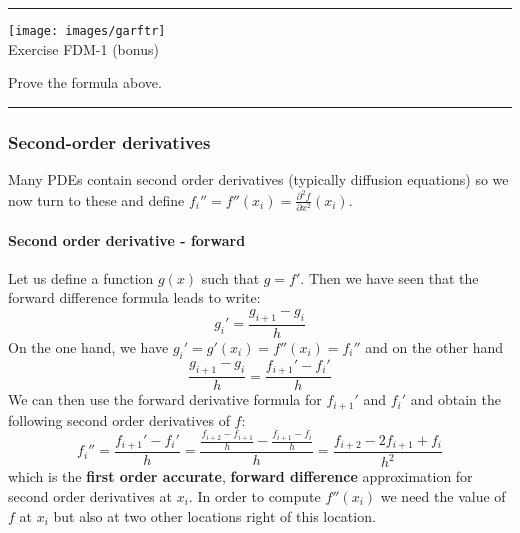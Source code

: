 \begin{center}
\begin{minipage}[t]{0.77\textwidth}
\par\noindent\rule{\textwidth}{0.4pt}

\begin{center}
\texttt{[image: images/garftr]} \\
{\color{orange}Exercise FDM-1 (bonus)}
\end{center}

Prove the formula above.

\par\noindent\rule{\textwidth}{0.4pt}
\end{minipage}
\end{center}





\subsubsection{Second-order derivatives}

Many PDEs contain second order derivatives (typically diffusion equations)
so we now turn to these and 
define $f_i''=f''(x_i) = \frac{\partial^2 f}{\partial x^2} (x_i)$. 

\paragraph{Second order derivative - forward} 
Let us define a function $g(x)$ such that $g=f'$. Then we have seen that the forward 
difference formula leads to write: 
\begin{equation}
g_i' = \frac{g_{i+1}-g_{i}}{h}
\end{equation}
On the one hand, we have $g_i'=g'(x_i)=f''(x_i)=f_i''$ and on the other hand
\begin{equation}
\frac{g_{i+1}-g_{i}}{h} = \frac{f_{i+1}'-f_{i}'}{h}
\end{equation}
We can then use the forward derivative formula for $f_{i+1}'$ and $f_{i}'$ and 
obtain the following second order derivatives of $f$:
\begin{equation}
f_{i}'' 
= \frac{f_{i+1}'-f_i'}{h} 
= \frac{\frac{f_{i+2}-f_{i+1}}{h}-
\frac{f_{i+1}-f_i}{h}
}{h} 
= \frac{f_{i+2}-2f_{i+1}+f_i}{h^2} 
\end{equation}
which is the {\bf first order accurate}, {\bf forward difference} approximation for
second order derivatives at $x_{i}$.
In order to compute $f''(x_i)$ we need the value of $f$ at $x_i$ but also at two 
other locations right of this location.

